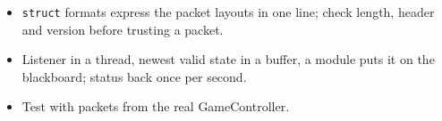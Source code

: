 \begin{keyidea}
\begin{itemize}[nosep]
  \item \texttt{struct} formats express the packet layouts in one line; check length, header and version before trusting a packet.
  \item Listener in a thread, newest valid state in a buffer, a module puts it on the blackboard; status back once per second.
  \item Test with packets from the real GameController.
\end{itemize}
\end{keyidea}

